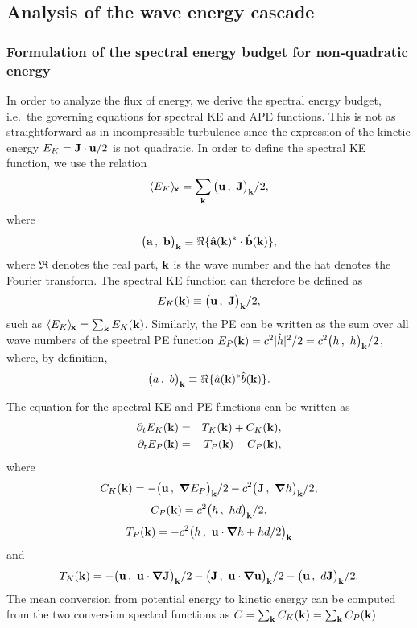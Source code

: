 


\subsection{Analysis of the wave energy cascade}

\subsubsection{Formulation of the spectral energy budget for
non-quadratic energy}

In order to analyze the flux of energy, we derive the spectral energy
budget, i.e.\ the governing equations for spectral KE and APE
functions.
%
This is not as straightforward as in incompressible turbulence since
the expression of the kinetic energy $E_K = \textbf{J}\cdot\textbf{u}/2$ is not
quadratic.
%
In order to define the spectral KE function, we use the relation
\begin{equation}
\meanx{ E_K } = \sum_\kk \scalarprod{\uu}{\JJ}/2,
\end{equation}
where
\begin{equation}
\big( \textbf{a} \, , \ \textbf{b} \big)_{\textbf{k}} \equiv \Re\{ \hat {\textbf{a}}(\textbf{k})^* \cdot \hat {\textbf{b}}(\textbf{k}) \},
\end{equation}
where $\Re$ denotes the real part, $\textbf{k}$ is the wave number and the
hat denotes the Fourier transform.
%
The spectral KE function can therefore be defined as
\begin{equation}
E_K(\textbf{k}) \equiv \big( \textbf{u} \, , \ \textbf{J} \big)_{\textbf{k}}/2, 
\end{equation}
such as $\meanx{ E_K } = \sum_\kk E_K(\kk)$.
%
Similarly, the PE can be written as the sum over all wave numbers of
the spectral PE function $E_P(\textbf{k}) = c^2 |\hat h|^2/2 = c^2
\big( h \, , \ h \big)_{\textbf{k}}/2$, where, by definition,
\begin{equation}
\big( a \, , \ b \big)_{\textbf{k}} \equiv \Re\{ \hat a(\textbf{k})^* \hat b(\textbf{k}) \}.
\end{equation}


The equation for the spectral KE and PE functions can be written as
\begin{eqnarray}
\partial_t E_K(\textbf{k}) &=& T_K(\textbf{k}) + C_K(\textbf{k}),\\
\partial_t E_P(\textbf{k}) &=& T_P(\textbf{k}) - C_P(\textbf{k}),
\end{eqnarray}
where
\begin{equation}
C_K(\textbf{k}) 
= -\big( \textbf{u} \, , \ \boldsymbol{\nabla} E_P \big)_{\textbf{k}}/2 - c^2 \big( \textbf{J} \, , \ \boldsymbol{\nabla} h \big)_{\textbf{k}}/2,
\end{equation}
\begin{equation}
C_P(\textbf{k}) = c^2 \big( h \, , \ hd \big)_{\textbf{k}} /2,
\end{equation}
\begin{equation}
T_P(\textbf{k}) = -c^2 \big( h \, , \ \textbf{u} \cdot \boldsymbol{\nabla} h + hd/2 \big)_{\textbf{k}}
\end{equation}
and
\begin{equation}
T_K(\textbf{k}) 
= -\big( \textbf{u} \, , \ \textbf{u} \cdot \boldsymbol{\nabla} \textbf{J} \big)_{\textbf{k}}/2
-\big( \textbf{J} \, , \ \textbf{u} \cdot \boldsymbol{\nabla} \textbf{u} \big)_{\textbf{k}}/2
-\big( \textbf{u} \, , \ d\textbf{J} \big)_{\textbf{k}}/2.
\end{equation}
The mean conversion from potential energy to kinetic energy can be
computed from the two conversion spectral functions as $C = \sum_{\textbf{k}}
C_K(\textbf{k}) = \sum_{\textbf{k}} C_P(\textbf{k})$.






